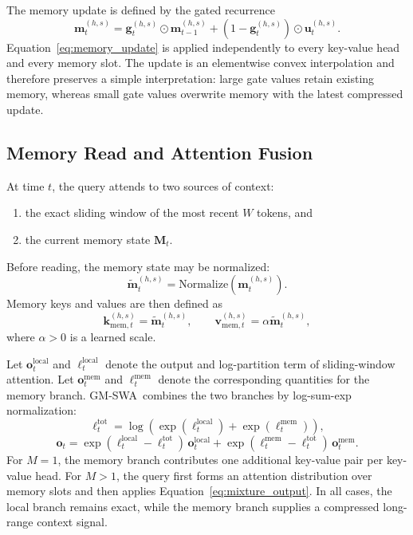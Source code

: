 \documentclass{article}
\newcommand{\model}{GM-SWA}
\begin{document}
The memory update is defined by the gated recurrence
\begin{equation}
\mathbf{m}^{(h,s)}_t
=
\mathbf{g}^{(h,s)}_t \odot \mathbf{m}^{(h,s)}_{t-1}
+
\left(1 - \mathbf{g}^{(h,s)}_t\right) \odot \mathbf{u}^{(h,s)}_t.
\label{eq:memory_update}
\end{equation}
Equation~\ref{eq:memory_update} is applied independently to every key-value head and every memory slot. The update is an elementwise convex interpolation and therefore preserves a simple interpretation: large gate values retain existing memory, whereas small gate values overwrite memory with the latest compressed update.

\subsection{Memory Read and Attention Fusion}

At time $t$, the query attends to two sources of context:
\begin{enumerate}
    \item the exact sliding window of the most recent $W$ tokens, and
    \item the current memory state $\mathbf{M}_t$.
\end{enumerate}

Before reading, the memory state may be normalized:
\begin{equation}
\tilde{\mathbf{m}}^{(h,s)}_t =
\mathrm{Normalize}\!\left(\mathbf{m}^{(h,s)}_t\right).
\end{equation}
Memory keys and values are then defined as
\begin{equation}
\mathbf{k}^{(h,s)}_{\mathrm{mem},t} = \tilde{\mathbf{m}}^{(h,s)}_t,
\qquad
\mathbf{v}^{(h,s)}_{\mathrm{mem},t} = \alpha \tilde{\mathbf{m}}^{(h,s)}_t,
\end{equation}
where $\alpha > 0$ is a learned scale.

Let $\mathbf{o}^{\mathrm{local}}_t$ and $\ell^{\mathrm{local}}_t$ denote the output and log-partition term of sliding-window attention. Let $\mathbf{o}^{\mathrm{mem}}_t$ and $\ell^{\mathrm{mem}}_t$ denote the corresponding quantities for the memory branch. \model\ combines the two branches by log-sum-exp normalization:
\begin{equation}
\ell^{\mathrm{tot}}_t = \log\!\left(\exp(\ell^{\mathrm{local}}_t) + \exp(\ell^{\mathrm{mem}}_t)\right),
\end{equation}
\begin{equation}
\mathbf{o}_t =
\exp(\ell^{\mathrm{local}}_t - \ell^{\mathrm{tot}}_t)\,\mathbf{o}^{\mathrm{local}}_t
+
\exp(\ell^{\mathrm{mem}}_t - \ell^{\mathrm{tot}}_t)\,\mathbf{o}^{\mathrm{mem}}_t.
\label{eq:mixture_output}
\end{equation}
For $M=1$, the memory branch contributes one additional key-value pair per key-value head. For $M>1$, the query first forms an attention distribution over memory slots and then applies Equation~\ref{eq:mixture_output}. In all cases, the local branch remains exact, while the memory branch supplies a compressed long-range context signal.
\end{document}
